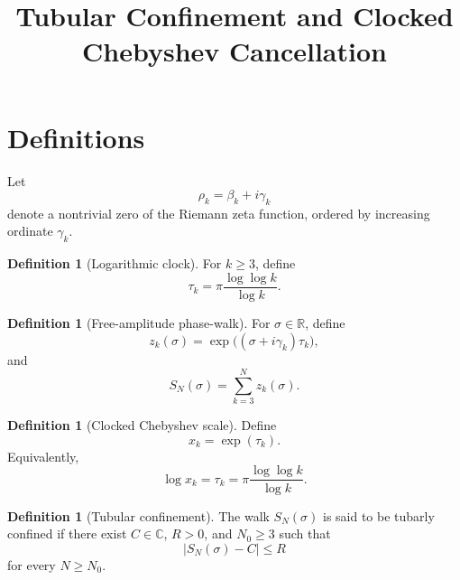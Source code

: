 \documentclass[11pt]{amsart}
\title{Tubular Confinement and Clocked Chebyshev Cancellation}
\author{}
\date{}
\numberwithin{equation}{section}
\theoremstyle{plain}
\theoremstyle{definition}
\newtheorem{definition}[theorem]{Definition}
\theoremstyle{remark}
\begin{document}
\maketitle

\tableofcontents

\section{Definitions}
\label{sec:definitions}

Let
\begin{equation}
\rho_k=\beta_k+i\gamma_k
\label{eq:zero_definition}
\end{equation}
denote a nontrivial zero of the Riemann zeta function, ordered by
increasing ordinate $\gamma_k$.

\begin{definition}[Logarithmic clock]
\label{def:logarithmic_clock}
For $k\ge 3$, define
\begin{equation}
\tau_k
=
\pi\frac{\log\log k}{\log k}.
\label{eq:tau_definition}
\end{equation}
\end{definition}

\begin{definition}[Free-amplitude phase-walk]
\label{def:free_amplitude_phase_walk}
For $\sigma\in\mathbb R$, define
\begin{equation}
z_k(\sigma)
=
\exp\big((\sigma+i\gamma_k)\tau_k\big),
\label{eq:zk_sigma_definition}
\end{equation}
and
\begin{equation}
S_N(\sigma)
=
\sum_{k=3}^{N}z_k(\sigma).
\label{eq:SN_sigma_definition}
\end{equation}
\end{definition}

\begin{definition}[Clocked Chebyshev scale]
\label{def:clocked_chebyshev_scale}
Define
\begin{equation}
x_k
=
\exp(\tau_k).
\label{eq:xk_definition}
\end{equation}
Equivalently,
\begin{equation}
\log x_k
=
\tau_k
=
\pi\frac{\log\log k}{\log k}.
\label{eq:log_xk_tau}
\end{equation}
\end{definition}

\begin{definition}[Tubular confinement]
\label{def:tubular_confinement}
The walk $S_N(\sigma)$ is said to be tubarly confined if there exist
$C\in\mathbb C$, $R>0$, and $N_0\ge 3$ such that
\begin{equation}
|S_N(\sigma)-C|\le R
\label{eq:tubular_confinement_definition}
\end{equation}
for every $N\ge N_0$.
\end{definition}
\end{document}

